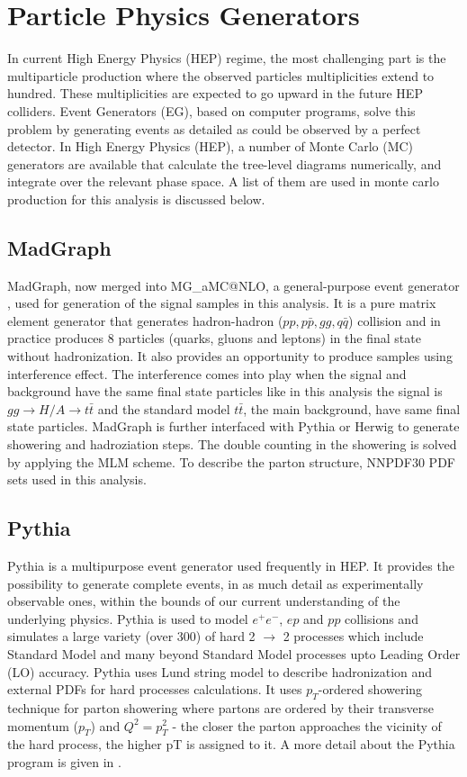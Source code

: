 \section{Particle Physics Generators}\label{sec:gnerators}
In current High Energy Physics (HEP) regime, the most challenging part is the multiparticle production where the observed particles multiplicities extend to hundred. These multiplicities are expected to go upward in the future HEP colliders. Event Generators (EG), based on computer programs, solve this problem by generating events as detailed as could be observed by a perfect detector.   
In High Energy Physics (HEP), a number of Monte Carlo (MC) generators are available that calculate the tree-level diagrams numerically, and integrate over the relevant phase space. A list of them are used in monte carlo production for this analysis is discussed below.
\subsection{MadGraph}
MadGraph, now merged into MG\_aMC@NLO, a general-purpose event generator \cite{madgraph}, used for generation of the signal samples in this analysis. It is a pure matrix element generator that generates hadron-hadron ($pp, p\bar{p}, gg, q\bar{q}$) collision and in practice produces 8 particles (quarks, gluons and leptons) in the final state without hadronization. It also provides an opportunity to produce samples using interference effect. The interference comes into play when the signal and background have the same final state particles like in this analysis the signal is $gg\rightarrow H/A \rightarrow t\bar{t}$ and the standard model $t\bar{t}$, the main background, have same final state particles. 
MadGraph is further interfaced with Pythia or Herwig to generate showering and hadroziation steps. The double counting in the showering is solved by applying the MLM scheme. To describe the parton structure, NNPDF30 PDF \cite{pdf_sets} sets used in this analysis. 

\subsection{Pythia}\label{subsec:pythia}
Pythia is a multipurpose event generator used frequently in HEP. It provides the possibility to generate complete events, in as much detail as experimentally observable ones, within the bounds of our current understanding of the underlying physics. Pythia is used to model $e^{+}e^{-}$, $ep$ and $pp$ collisions and simulates a large variety (over 300) of hard 2 $\rightarrow$ 2 processes which include Standard Model and many beyond Standard Model processes upto Leading Order (LO) accuracy. Pythia uses Lund string model \cite{lund_string_model} to describe hadronization and external PDFs for hard processes calculations. It uses $p_{T}$-ordered showering technique for parton showering where partons are ordered by their transverse momentum ($p_{T}$) and $Q^{2} = p^{2}_{T}$ - the closer the parton approaches the vicinity of the hard process, the higher pT is assigned to it. A more detail about the Pythia program is given in \cite{pythia}.
